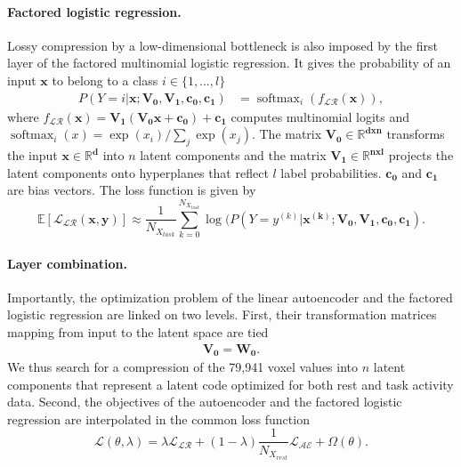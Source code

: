 \documentclass{article} %
\DeclareMathOperator{\softmax}{softmax}
\begin{document}
\paragraph{Factored logistic regression.}
Lossy compression by a low-dimensional bottleneck
is also imposed by the first layer of the factored
multinomial logistic regression.
It gives the probability of an input $\mathbf{x}$ to belong
to a class $i \in \{1, \dots, l\}$
\begin{equation}
  \begin{split}
    P(Y=i|\mathbf{x; V_0,V_1,c_0, c_1}) &= \softmax_i(f_\mathcal{LR}(\mathbf x)),
  \end{split}
  \label{eq:lr}
\end{equation}
where \(f_\mathcal{LR}(\mathbf x) = \mathbf{V_1 (V_0 x + c_0) + c_1}\) computes 
multinomial logits and \(\softmax_i(x) = \exp(x_i)/\sum_j\exp(x_j)\).
The matrix $\mathbf{V_0 \in \mathbb{R}^{dxn}}$
transforms the input $\mathbf{x \in \mathbb{R}^{d}}$
into $n$ latent components
and the matrix $\mathbf{V_1 \in \mathbb{R}^{nxl}}$
projects the latent components
onto hyperplanes that reflect $l$ label probabilities.
$\mathbf{c_0}$ and $\mathbf{c_1}$ are
bias vectors.
The loss function is given by
\begin{equation}
    \mathbb E\left[{\mathcal{L_{LR}}}(\mathbf{x, y})\right] \approx %
\frac{1}{N_{X_{task}}} \sum_{k=0}^{N_{X_{task}}} \log(P(Y=y^{(k)}|\mathbf{x^{(k)}; V_0, V_1, c_0, c_1}).
\label{eq:lr_loss}
\end{equation}

\paragraph{Layer combination.}
Importantly, the optimization problem of the linear autoencoder
and the factored logistic regression
are linked on two levels. First, their transformation matrices mapping from
input to the latent space are tied
\begin{eqnarray}
  \mathbf{V_0} = \mathbf{W_0}.
\end{eqnarray}
We thus search for a compression of the 79,941 voxel values into $n$ latent
components that represent a latent code optimized for both
rest and task activity data.
Second, the objectives of the autoencoder and the factored
logistic regression are interpolated in the common loss function
\begin{equation}
{\mathcal{L}}(\theta, \lambda) = \lambda {\mathcal{L_{LR}}}
+ (1-\lambda)\frac{1}{N_{X_{rest}}} {\mathcal{L_{AE}}} + \Omega(\theta).
  \label{eq:loss_equ}
\end{equation}
\end{document}
